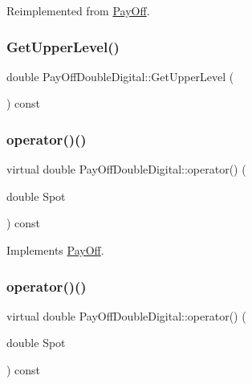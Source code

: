 Reimplemented from \hyperlink{classPayOff_aa7a2451e286496c8d5a153000a818d34}{Pay\+Off}.

\hypertarget{classPayOffDoubleDigital_ad82002fa94591747e352019de909da04}{}\label{classPayOffDoubleDigital_ad82002fa94591747e352019de909da04} 
\subsubsection{\texorpdfstring{Get\+Upper\+Level()}{GetUpperLevel()}}
{\footnotesize\ttfamily double Pay\+Off\+Double\+Digital\+::\+Get\+Upper\+Level (\begin{DoxyParamCaption}{ }\end{DoxyParamCaption}) const}

\hypertarget{classPayOffDoubleDigital_a158d8976f26fbb2ae1508d5e945e32d9}{}\label{classPayOffDoubleDigital_a158d8976f26fbb2ae1508d5e945e32d9} 
\subsubsection{\texorpdfstring{operator()()}{operator()()}\hspace{0.1cm}{\footnotesize\ttfamily [1/2]}}
{\footnotesize\ttfamily virtual double Pay\+Off\+Double\+Digital\+::operator() (\begin{DoxyParamCaption}\item[{double}]{Spot }\end{DoxyParamCaption}) const\hspace{0.3cm}{\ttfamily [virtual]}}



Implements \hyperlink{classPayOff_a5ae17d82c233ef5568c8fb0539703000}{Pay\+Off}.

\hypertarget{classPayOffDoubleDigital_a158d8976f26fbb2ae1508d5e945e32d9}{}\label{classPayOffDoubleDigital_a158d8976f26fbb2ae1508d5e945e32d9} 
\subsubsection{\texorpdfstring{operator()()}{operator()()}\hspace{0.1cm}{\footnotesize\ttfamily [2/2]}}
{\footnotesize\ttfamily virtual double Pay\+Off\+Double\+Digital\+::operator() (\begin{DoxyParamCaption}\item[{double}]{Spot }\end{DoxyParamCaption}) const\hspace{0.3cm}{\ttfamily [virtual]}}



